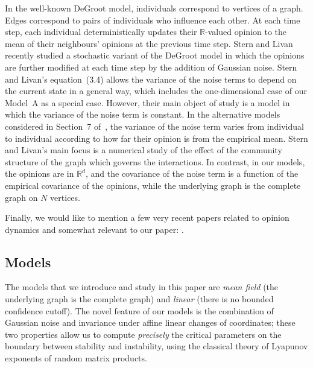\documentclass[12pt]{article}
\newcommand{\1}{\mathbf{1}}
\begin{document}
In the well-known DeGroot model, individuals correspond to vertices of a graph. Edges correspond to pairs of individuals who influence each other. At each time step, each individual deterministically updates their $\mathbb{R}$-valued opinion to the mean of their neighbours' opinions at the previous time step. Stern and Livan \cite{SternLivan} recently studied a stochastic variant of the DeGroot model in which the opinions are further modified at each time step by the addition of Gaussian noise. Stern and Livan's equation~(3.4) allows the variance of the noise terms to depend on the current state in a general way, which includes the one-dimensional case of our Model~A as a special case. However, their main object of study is a model in which the variance of the noise term is constant.  In the alternative models considered in Section~7 of~\cite{SternLivan}, the variance of the noise term varies from individual to individual according to how far their opinion is from the empirical mean. Stern and Livan's main focus is a numerical study of the effect of the community structure of the graph which governs the interactions. In contrast, in our models, the opinions are in $\mathbb{R}^d$, and the covariance of the noise term is a function of the empirical covariance of the opinions, while the underlying graph is the complete graph on $N$ vertices. 

{Finally, we would like to mention a few very recent papers related to opinion dynamics and somewhat relevant to our paper: \cite{OD3,OD2,OD1}.}

\subsection{Models}


The models that we introduce and study in this paper are \emph{mean field} (the underlying graph is the complete graph) and {\em linear} (there is no bounded confidence cutoff). 
The novel feature of our models is the combination of Gaussian noise and invariance under affine linear changes of coordinates; these two properties allow us to compute {\em precisely} the critical parameters on the boundary between stability and instability, using the classical theory of Lyapunov exponents of random matrix products.
\end{document}
